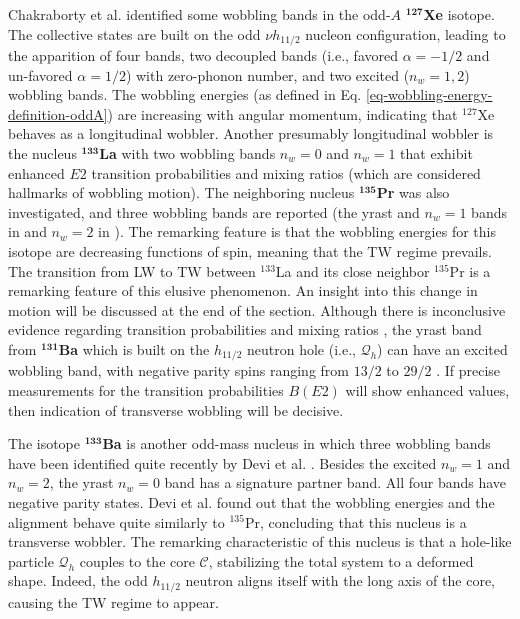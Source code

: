 Chakraborty et al. \cite{chakraborty2020multiphonon} identified some wobbling bands in the odd-$A$ $^\mathbf{127}$\textbf{Xe} isotope. The collective states are built on the odd $\nu h_{11/2}$ nucleon configuration, leading to the apparition of four bands, two decoupled bands (i.e., favored $\alpha=-1/2$ and un-favored $\alpha=1/2$) with zero-phonon number, and two excited ($n_w=1,2$) wobbling bands. The wobbling energies (as defined in Eq. \ref{eq-wobbling-energy-definition-oddA}) are increasing with angular momentum, indicating that $^{127}$Xe behaves as a longitudinal wobbler. Another presumably longitudinal wobbler is the nucleus $^\mathbf{133}$\textbf{La} \cite{biswas2019longitudinal} with two wobbling bands $n_w=0$ and $n_w=1$ that exhibit enhanced $E2$ transition probabilities and mixing ratios (which are considered hallmarks of wobbling motion). The neighboring nucleus $^\mathbf{135}$\textbf{Pr} was also investigated, and three wobbling bands are reported (the yrast and $n_w=1$ bands in \cite{matta2017transverse} and $n_w=2$ in \cite{sensharma2019two}). The remarking feature is that the wobbling energies for this isotope are decreasing functions of spin, meaning that the TW regime prevails. The transition from LW to TW between $^{133}$La and its close neighbor $^{135}$Pr is a remarking feature of this elusive phenomenon. An insight into this change in motion will be discussed at the end of the section. Although there is inconclusive evidence regarding transition probabilities and mixing ratios \cite{ma1990competing,kaur2014high}, the yrast band from $^\mathbf{131}$\textbf{Ba} which is built on the $h_{11/2}$ neutron hole (i.e., $\mathcal{Q}_h$) can have an excited wobbling band, with negative parity spins ranging from $13/2$ to $29/2$ \cite{petrache_2018}. If precise measurements for the transition probabilities $B(E2)$ will show enhanced values, then indication of transverse wobbling will be decisive.

The isotope $^\mathbf{133}$\textbf{Ba} is another odd-mass nucleus in which three wobbling bands have been identified quite recently by Devi et al. \cite{devi2021observation}. Besides the excited $n_w=1$ and $n_w=2$, the yrast $n_w=0$ band has a signature partner band. All four bands have negative parity states. Devi et al. found out that the wobbling energies and the alignment behave quite similarly to $^{135}$Pr, concluding that this nucleus is a transverse wobbler. The remarking characteristic of this nucleus is that a hole-like particle $\mathcal{Q}_h$ couples to the core $\mathscr{C}$, stabilizing the total system to a deformed shape. Indeed, the odd $h_{11/2}$ neutron aligns itself with the long axis of the core, causing the TW regime to appear.

